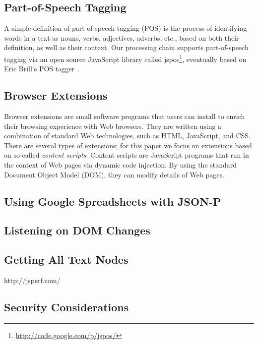 \documentclass{acm_proc_article-sp}
\let\oldemph\emph
\renewcommand{\emph}[1]{\oldemph{\fontsize{9}{9}\selectfont #1}}
\newcommand{\inlinelistingsize}{\fontsize{8pt}{11pt}}
\let\oldurl\url
\renewcommand{\url}[1]{\inlinelistingsize\oldurl{#1}}
\begin{document}
\subsection{Part-of-Speech Tagging}
A simple definition of part-of-speech tagging (POS) is the process of identifying words in a text as nouns, verbs, adjectives, adverbs, etc., based on both their definition, as well as their context.
Our processing chain supports part-of-speech tagging via an open source JavaScript library called jspos\footnote{\url{http://code.google.com/p/jspos/}},
eventually based on Eric Brill's POS tagger~\cite{brill1992simple}.

\subsection{Browser Extensions}
Browser extensions are small software programs that users can install to enrich their browsing experience with Web browsers.
They are written using a combination of standard Web technologies, such as HTML, JavaScript, and CSS.
There are several types of extensions; for this paper we focus on extensions based on so-called \emph{content scripts}.
Content scripts are JavaScript programs that run in the context of Web pages via dynamic code injection.
By using the standard Document Object Model (DOM), they can modify details of Web pages.

\subsection{Using Google Spreadsheets with JSON-P}
\cite{jsonp2009}

\subsection{Listening on DOM Changes}
\cite{w3cevents2011}

\subsection{Getting All Text Nodes}
http://jsperf.com/

\subsection{Security Considerations}
\end{document}
